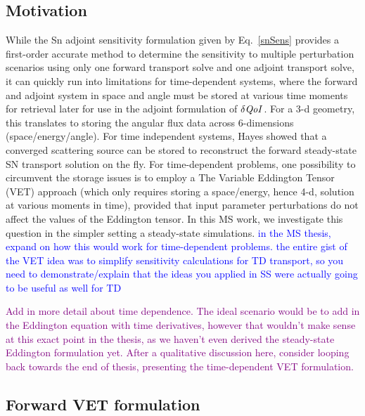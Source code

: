\documentclass[12pt]{report}
\newcommand{\qoi}{{\it QoI}\xspace}
\newcommand{\comment}[2]{\marginpar{\textcolor{#2}{$\star$}}\textcolor{#2}{#1}\newline}
\newcommand{\jcr}[1]{\comment{#1}{blue}}
\newcommand{\todo}[1]{\comment{#1}{purple}}
\newcommand{\jcr}[1]{\phantom{a}}
\newcommand{\todo}[1]{\phantom{a}}
\begin{document}
\subsection{Motivation} 
While the Sn adjoint sensitivity formulation given by Eq.~\eqref{snSens} provides a first-order accurate method to determine the sensitivity to multiple perturbation scenarios using only one forward transport solve and one adjoint transport solve, it can quickly run into limitations for time-dependent systems, where the forward and adjoint system in space and angle must be stored at various time moments for retrieval later for use in the adjoint formulation of $\delta \qoi$. For a 3-d geometry, this translates to storing the angular
flux data across 6-dimensions (space/energy/angle). For time independent systems, Hayes \cite{Stripling} showed that a converged scattering source can be stored to reconstruct 
the forward steady-state SN transport solution on the fly. For time-dependent problems, one possibility to circumvent the storage issues is to employ a The Variable Eddington Tensor (VET) approach (which only requires
storing a space/energy, hence 4-d, solution at various moments in time), provided that input parameter perturbations do not affect the values of the Eddington tensor. In this MS work,
we investigate this question in the simpler setting a steady-state simulations.
\jcr{in the MS thesis, expand on how this would work for time-dependent problems. the entire
gist of the VET idea was to simplify sensitivity calculations for TD transport, so you need
to demonstrate/explain that the ideas you applied in SS were actually going to be useful as well for TD}

\todo{Add in more detail about time dependence. The ideal scenario would be to add in the Eddington equation with time derivatives, however that wouldn't make sense at this exact point in the thesis, as we haven't even derived the steady-state Eddington formulation yet. After a qualitative discussion here, consider looping back towards the end of thesis, presenting the time-dependent VET formulation.}

\subsection{Forward VET formulation}
\end{document}
